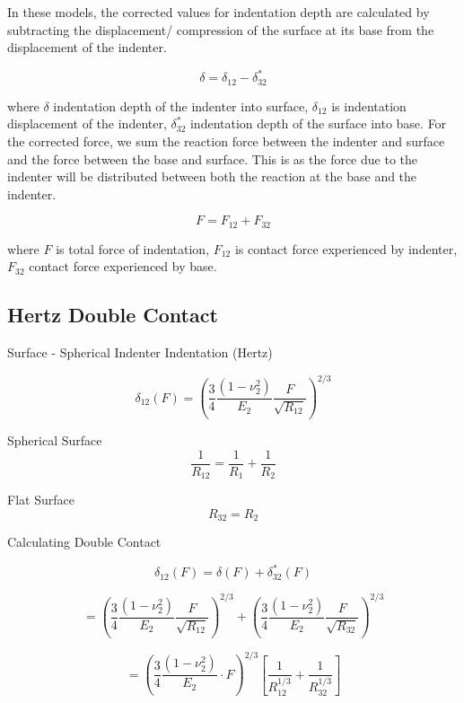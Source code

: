 In these models, the corrected values for indentation depth are calculated by subtracting the displacement/ compression of the surface at its base from the displacement of the indenter. 

\begin{equation}\delta = \delta_{12}-\delta^*_{32}\label{eq: Corrected Indentation}\end{equation}

where $\delta$ indentation depth of the indenter into surface, $\delta_{12}$ is indentation displacement of the indenter, $\delta^*_{32}$ indentation depth of the surface into base. For the corrected force, we sum the reaction force between the indenter and surface and the force between the base and surface. This is as the force due to the indenter will be distributed between both the reaction at the base and the indenter.

\begin{equation} F = F_{12}+F_{32}\label{eq: Corrected Force}\end{equation}

where $F$ is total force of indentation, $F_{12}$ is contact force experienced by indenter, $F_{32}$ contact force experienced by base.


\subsection{Hertz Double Contact\label{Appendix: Hertz Double}} 
 Surface - Spherical Indenter Indentation (Hertz)
 
\begin{equation} \delta_{12}(F) = \left( \frac{3}{4} \frac{(1-\nu_2^2)}{E_2} \frac{F}{\sqrt{R_{12}}} \right)^{2/3}\end{equation}

 Spherical Surface 
$$ \frac{1}{R_{12}} = \frac{1}{R_{1}} + \frac{1}{R_{2}} $$

 Flat Surface 
$$R_{32} = R_{2}$$

 Calculating Double Contact

$$ \delta_{12}(F) = \delta(F) + \delta_{32}^*(F)  $$

$$ =    \left( \frac{3}{4} \frac{(1-\nu_2^2)}{E_2} \frac{F}{\sqrt{R_{12}}} \right)^{2/3}  +     \left( \frac{3}{4} \frac{(1-\nu_2^2)}{E_2} \frac{F}{\sqrt{R_{32}}} \right)^{2/3}
$$

$$ =    \left( \frac{3}{4} \frac{(1-\nu_2^2)}{E_2} \cdot F \right)^{2/3} \left[ \frac{1}{R_{12}^{1/3}}  + \frac{1}{R_{32}^{1/3}} \right] 
$$

